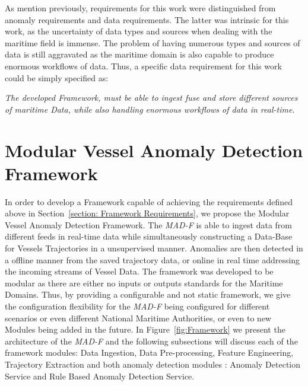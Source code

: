 As mention previously, requirements for this work were distinguished from anomaly requirements and data requirements. The latter was intrinsic for this work, as the uncertainty of data types and sources when dealing with the maritime field is immense. The problem of having numerous types and sources of data is still aggravated as the maritime domain is also capable to produce enormous workflows of data. Thus, a specific data requirement for this work could be simply specified as: 

\emph{The developed Framework, must be able to ingest fuse and store different sources of maritime Data, while also handling enormous workflows of data in real-time.}

\section{Modular Vessel Anomaly Detection Framework}
In order to develop a Framework capable of achieving the requirements defined above in Section~\ref{section: Framework Requirements}, we propose the Modular Vessel Anomaly Detection Framework. The \emph{MAD-F} is able to ingest data from different feeds in real-time data while simultaneously constructing a Data-Base for Vessels Trajectories in a unsupervised manner. Anomalies are then detected in a offline manner from the saved trajectory data, or online in real time addressing the incoming streams of Vessel Data. 
The framework was developed to be modular as there are either no inputs or outputs standards for the Maritime Domains. Thus, by providing a configurable and not static framework, we give the configuration flexibility for the \emph{MAD-F} being configured for different scenarios or even different National Maritime Authorities, or even to new Modules being added in the future.
In Figure~\ref{fig:Framework} we present the architecture of the \emph{MAD-F} and the following subsections will discuss each of the framework modules: Data Ingestion, Data Pre-processing, Feature Engineering, Trajectory Extraction and both anomaly detection modules : Anomaly Detection Service and Rule Based Anomaly Detection Service.
